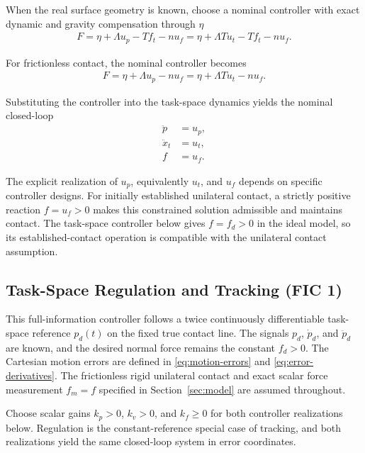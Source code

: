 \documentclass[10pt,journal,letterpaper]{IEEEtran}
\begin{document}
When the real surface geometry is known, choose a nominal controller with exact dynamic and gravity compensation through $\eta$
\begin{align*}
F = \eta + \Lambda u_{p} - Tf_{t} - nu_{f}
= \eta + \Lambda T u_{t} - Tf_{t} - nu_{f}.
\end{align*}

For frictionless contact, the nominal controller becomes
\begin{equation}\label{eq:nominal-force-law}
\begin{aligned}
F = \eta + \Lambda u_{p} - nu_{f}
= \eta + \Lambda T u_{t} - nu_{f}.
\end{aligned}
\end{equation}

Substituting the controller into the task-space dynamics yields the nominal closed-loop
\begin{equation}\label{eq:nominal-closed-loop}
\begin{aligned}
\ddot p&=u_{p}, \\
\ddot x_{t}&=u_{t}, \\
f&=u_{f}.
\end{aligned}
\end{equation}

The explicit realization of $u_{p}$, equivalently $u_{t}$, and $u_{f}$ depends on specific controller designs. For initially established unilateral contact, a strictly positive reaction $f=u_f>0$ makes this constrained solution admissible and maintains contact. The task-space controller below gives $f=f_d>0$ in the ideal model, so its established-contact operation is compatible with the unilateral contact assumption.

\subsection{Task-Space Regulation and Tracking (FIC 1)}

This full-information controller follows a twice continuously differentiable task-space reference $p_d(t)$ on the fixed true contact line. The signals $p_d$, $\dot p_d$, and $\ddot p_d$ are known, and the desired normal force remains the constant $f_d>0$. The Cartesian motion errors are defined in \eqref{eq:motion-errors} and \eqref{eq:error-derivatives}. The frictionless rigid unilateral contact and exact scalar force measurement $f_m=f$ specified in Section~\ref{sec:model} are assumed throughout.

Choose scalar gains $k_p>0$, $k_v>0$, and $k_f\geq0$ for both controller realizations below. Regulation is the constant-reference special case of tracking, and both realizations yield the same closed-loop system in error coordinates.
\end{document}
